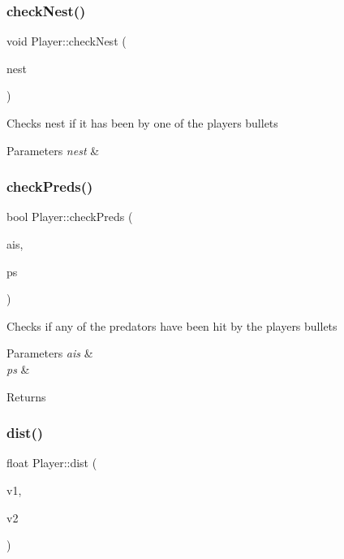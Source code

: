 \subsubsection{\texorpdfstring{checkNest()}{checkNest()}}
{\footnotesize\ttfamily void Player\+::check\+Nest (\begin{DoxyParamCaption}\item[{\mbox{\hyperlink{class_nest}{Nest}} \&}]{nest }\end{DoxyParamCaption})}



Checks nest if it has been by one of the players bullets 


\begin{DoxyParams}{Parameters}
{\em nest} & \\
\hline
\end{DoxyParams}
\mbox{\label{class_player_a094e0de53a41a86c8e15d4c84c6a8064}} 
\subsubsection{\texorpdfstring{checkPreds()}{checkPreds()}}
{\footnotesize\ttfamily bool Player\+::check\+Preds (\begin{DoxyParamCaption}\item[{std\+::vector$<$ \mbox{\hyperlink{class_a_i}{AI}} $\ast$ $>$ \&}]{ais,  }\item[{std\+::vector$<$ \mbox{\hyperlink{class_particle_system}{Particle\+System}} $\ast$ $>$ \&}]{ps }\end{DoxyParamCaption})}



Checks if any of the predators have been hit by the players bullets 


\begin{DoxyParams}{Parameters}
{\em ais} & \\
\hline
{\em ps} & \\
\hline
\end{DoxyParams}
\begin{DoxyReturn}{Returns}

\end{DoxyReturn}
\mbox{\label{class_player_aaa07ec2f61547d6420bcde4772e4347b}} 
\subsubsection{\texorpdfstring{dist()}{dist()}}
{\footnotesize\ttfamily float Player\+::dist (\begin{DoxyParamCaption}\item[{sf\+::\+Vector2f}]{v1,  }\item[{sf\+::\+Vector2f}]{v2 }\end{DoxyParamCaption})}



